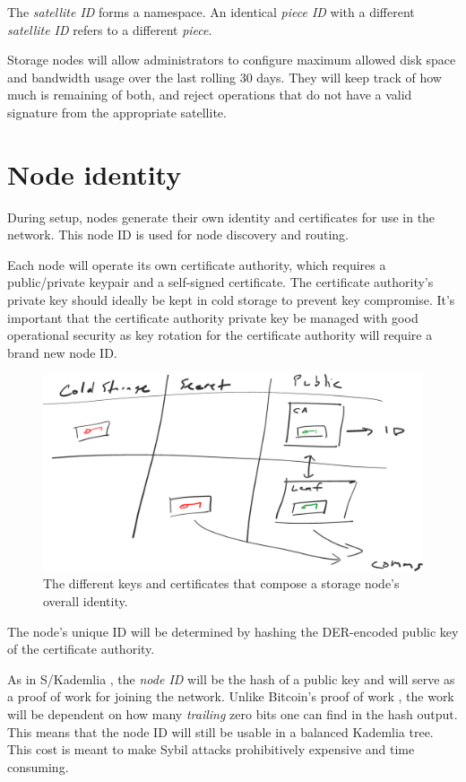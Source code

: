 \documentclass[11pt,fleqn,openany]{book}
\begin{document}
The {\em satellite ID} forms a namespace. An identical {\em piece ID} with a
different {\em satellite ID} refers to a different {\em piece}.

Storage nodes will allow administrators to configure maximum allowed disk
space and bandwidth usage over the last rolling 30 days.
They will keep track of how much is remaining of both, and reject operations
that do not have a valid signature from the appropriate satellite.

\section{Node identity}\label{sec:node-id}

During setup, nodes generate their own identity and certificates for use in
the network.
This node ID is used for node discovery and routing.

Each node will operate its own certificate authority, which requires a
public/private keypair and a self-signed certificate. The certificate
authority's private key should ideally be kept in cold storage to prevent key
compromise.
It's important that the certificate authority private key be managed with good
operational security as key rotation for the certificate authority will require
a brand new node ID.

\begin{figure}
\centering
\includegraphics[width=.8\textwidth]{diagram-drafts/identity.eps}
\caption{The different keys and certificates that compose a storage node's
overall identity.}
\end{figure}

The node's unique ID will be determined by hashing the DER-encoded public key
of the certificate authority.

As in S/Kademlia \cite{skad}, the {\em node ID} will be the hash of a public key
and will serve as a proof of work for joining the network. Unlike Bitcoin's
proof of work \cite{bitcoin}, the work will be dependent on how many
{\em trailing}
zero bits one can find in the hash output. This means that the node ID will
still be usable in a balanced Kademlia \cite{kad} tree.
This cost is meant to make Sybil attacks prohibitively expensive and time
consuming.
\end{document}
